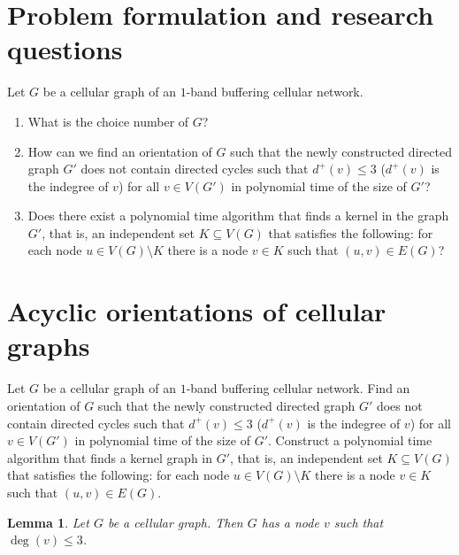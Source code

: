 \documentclass[letterpaper, 10 pt, conference]{ieeeconf}  %
\newtheorem{lem}{Lemma}
\begin{document}
\section{Problem formulation and research questions}
Let $G$ be a cellular graph of an $1$-band buffering cellular network. 
\begin{enumerate}
\item What is the choice number of $G$?
\item How can we find an orientation of $G$ such that the newly constructed directed graph $G'$ does not contain directed cycles such that $d^+(v) \leqslant 3$ ($d^+(v)$ is the indegree of $v$) for all $v \in V(G')$ in polynomial time of the size of $G'$?
\item Does there exist a polynomial time algorithm that finds a kernel in the graph $G'$, that is, an independent set $K \subseteq V(G)$ that satisfies the following: for each node $u \in V(G) \setminus K$ there is a node $v \in K$ such that $(u,v) \in E(G)$?
\end{enumerate}
\section{Acyclic orientations of cellular graphs}

Let $G$ be a cellular graph of an $1$-band buffering cellular network. Find an orientation of $G$ such that the newly constructed directed graph $G'$ does not contain directed cycles such that $d^+(v) \leqslant 3$ ($d^+(v)$ is the indegree of $v$) for all $v \in V(G')$ in polynomial time of the size of $G'$. Construct a polynomial time algorithm that finds a kernel graph in $G'$, that is, an independent set $K \subseteq V(G)$ that satisfies the following: for each node $u \in V(G) \setminus K$ there is a node $v \in K$ such that $(u,v) \in E(G)$.


\begin{lem}\label{lem:degree-constraint}
Let $G$ be a cellular graph. Then $G$ has a node $v$ such that $\deg(v) \leqslant 3$.
\end{lem}
\end{document}
